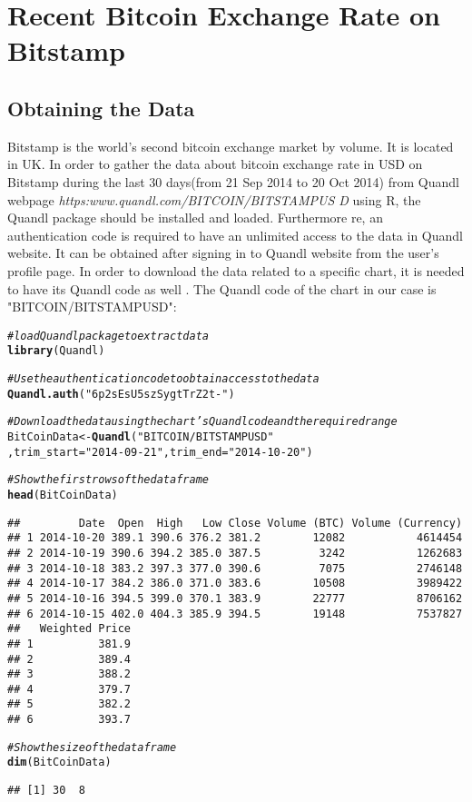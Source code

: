 \documentclass{article}\usepackage[]{graphicx}\usepackage[]{color}
\makeatletter
\newcommand{\hlstr}[1]{\textcolor[rgb]{0.192,0.494,0.8}{#1}}%
\newcommand{\hlcom}[1]{\textcolor[rgb]{0.678,0.584,0.686}{\textit{#1}}}%
\newcommand{\hlstd}[1]{\textcolor[rgb]{0.345,0.345,0.345}{#1}}%
\newcommand{\hlkwb}[1]{\textcolor[rgb]{0.69,0.353,0.396}{#1}}%
\newcommand{\hlkwc}[1]{\textcolor[rgb]{0.333,0.667,0.333}{#1}}%
\newcommand{\hlkwd}[1]{\textcolor[rgb]{0.737,0.353,0.396}{\textbf{#1}}}%
\newenvironment{kframe}{%
 \def\at@end@of@kframe{}%
 \ifinner\ifhmode%
  \def\at@end@of@kframe{\end{minipage}}%
  \begin{minipage}{\columnwidth}%
 \fi\fi%
 \def\FrameCommand##1{\hskip\@totalleftmargin \hskip-\fboxsep
 \colorbox{shadecolor}{##1}\hskip-\fboxsep
     \hskip-\linewidth \hskip-\@totalleftmargin \hskip\columnwidth}%
 \MakeFramed {\advance\hsize-\width
   \@totalleftmargin\z@ \linewidth\hsize
   \@setminipage}}%
 {\par\unskip\endMakeFramed%
 \at@end@of@kframe}
\newenvironment{knitrout}{}{} %
\makeatother
\begin{document}
\section{Recent Bitcoin Exchange Rate on Bitstamp}
\subsection{Obtaining the Data}
Bitstamp is the world's second bitcoin exchange market by volume. It is 
located in UK. In order to gather the data about bitcoin exchange rate
in USD on Bitstamp during the last 30 days(from 21 Sep 2014 to 20 Oct 
2014) from Quandl webpage \textit{https:www.quandl.com/BITCOIN/BITSTAMPUS
D}  using R, the Quandl package should be installed and loaded. Furthermore 
re, an authentication code is required to have an unlimited access to the 
data in Quandl website. It can be obtained after signing in to Quandl 
website from the user's profile page. In order to download the data 
related to a specific chart, it is needed to have its Quandl code as well
. The Quandl code of the chart in our case is "BITCOIN/BITSTAMPUSD":
\begin{knitrout}
\color{fgcolor}\begin{kframe}
\begin{alltt}
\hlcom{#load Quandl package to extract data }
\hlkwd{library}\hlstd{(Quandl)}

\hlcom{#Use the authentication code to obtain access to the data}
\hlkwd{Quandl.auth}\hlstd{(}\hlstr{"6p2sEsU5szSygtTrZ2t-"}\hlstd{)}

\hlcom{#Download the data using the chart's Quandl code and the required range}
\hlstd{BitCoinData} \hlkwb{<-} \hlkwd{Quandl}\hlstd{(}\hlstr{"BITCOIN/BITSTAMPUSD"}
                      \hlstd{,}\hlkwc{trim_start}\hlstd{=}\hlstr{"2014-09-21"}\hlstd{,}\hlkwc{trim_end}\hlstd{=}\hlstr{"2014-10-20"}\hlstd{)}

\hlcom{#Show the first rows of the data frame}
\hlkwd{head}\hlstd{(BitCoinData)}
\end{alltt}
\begin{verbatim}
##         Date  Open  High   Low Close Volume (BTC) Volume (Currency)
## 1 2014-10-20 389.1 390.6 376.2 381.2        12082           4614454
## 2 2014-10-19 390.6 394.2 385.0 387.5         3242           1262683
## 3 2014-10-18 383.2 397.3 377.0 390.6         7075           2746148
## 4 2014-10-17 384.2 386.0 371.0 383.6        10508           3989422
## 5 2014-10-16 394.5 399.0 370.1 383.9        22777           8706162
## 6 2014-10-15 402.0 404.3 385.9 394.5        19148           7537827
##   Weighted Price
## 1          381.9
## 2          389.4
## 3          388.2
## 4          379.7
## 5          382.2
## 6          393.7
\end{verbatim}
\begin{alltt}
\hlcom{#Show the size of the data frame}
\hlkwd{dim}\hlstd{(BitCoinData)}
\end{alltt}
\begin{verbatim}
## [1] 30  8
\end{verbatim}
\end{kframe}
\end{knitrout}
\end{document}
